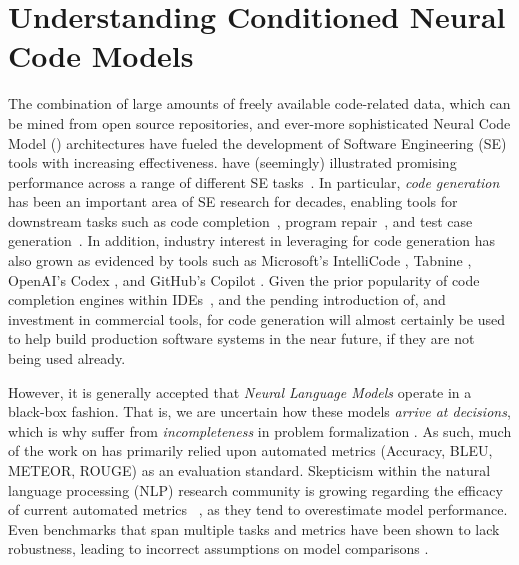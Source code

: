 \chapter{Understanding Conditioned \hfill \break Neural Code Models}
\label{ch6:conditioned}

The combination of large amounts of freely available code-related data, which can be mined from open source repositories, and ever-more sophisticated Neural Code Model (\nlm) architectures have fueled the development of Software Engineering (SE) tools with increasing effectiveness. \nlms have (seemingly) illustrated promising performance across a range of different SE tasks~\citep{Watson:ICSE20,White:MSR15,ciniselli2021empirical,Mastropaolo2021StudyingTasks}. In particular, \textit{code generation} has been an important area of SE research for decades, enabling tools for downstream tasks such as code completion~\citep{MSR-Completion}, program repair~\citep{Chen2019sequencer}, and test case generation~\citep{Watson:ICSE20}. In addition, industry interest in leveraging \nlms for code generation has also grown as evidenced by tools such as Microsoft's IntelliCode \citep{intellicode}, Tabnine \citep{tabnine}, OpenAI's Codex \citep{openai_codex}, and GitHub's Copilot \citep{github_copilot}. Given the prior popularity of code completion engines within IDEs~\citep{murphy2006ide}, and the pending introduction of, and investment in commercial tools, \nlms for code generation will almost certainly be used to help build production software systems in the near future, if they are not being used already.

However, it is generally accepted that \textit{Neural Language Models} operate in a black-box fashion. That is, we are uncertain how these models \textit{arrive at decisions}, which is why \nlms suffer from \textit{incompleteness} in problem formalization \citep{Doshi-Velez2017TowardsLearning}. As such, much of the work on \nlms has primarily relied upon automated metrics (\eg Accuracy, BLEU, METEOR, ROUGE) as an evaluation standard. Skepticism within the natural language processing (NLP) research community is growing regarding the efficacy of current automated metrics ~\citep{ribeiro2020checklist, rei2020comet, kocmi2021ship}, as they tend to overestimate model performance. Even benchmarks that span multiple tasks and metrics have been shown to lack robustness, leading to incorrect assumptions on model comparisons \citep{dehghani2021benchmark}. 

